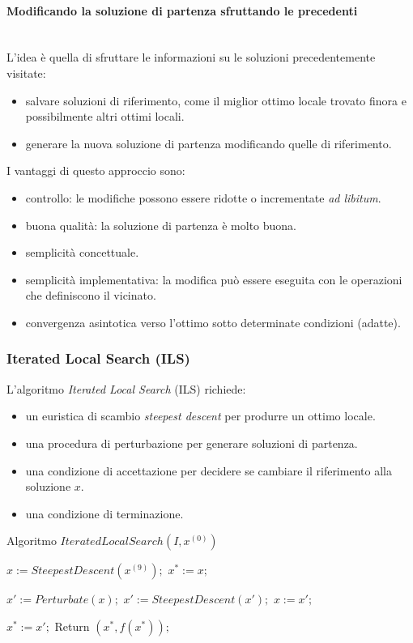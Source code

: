 \documentclass{article}
\begin{document}
\paragraph{Modificando la soluzione di partenza sfruttando le precedenti}\mbox{}\\
L'idea è quella di sfruttare le informazioni su le soluzioni precedentemente visitate:
\begin{itemize}
    \item salvare soluzioni di riferimento, come il miglior ottimo locale
    trovato finora e possibilmente altri ottimi locali.
    \item generare la nuova soluzione di partenza modificando quelle di riferimento.
\end{itemize}
I vantaggi di questo approccio sono:
\begin{itemize}
    \item controllo: le modifiche possono essere ridotte o incrementate \textit{ad libitum}.
    \item buona qualità: la soluzione di partenza è molto buona.
    \item semplicità concettuale.
    \item semplicità implementativa: la modifica può essere eseguita con le operazioni
    che definiscono il vicinato.
    \item convergenza asintotica verso l'ottimo sotto determinate condizioni (adatte).
\end{itemize}

\subsubsection{Iterated Local Search (ILS)}
L'algoritmo \textit{Iterated Local Search} (ILS) richiede:
\begin{itemize}
    \item un euristica di scambio \textit{steepest descent} per produrre un ottimo locale.
    \item una procedura di perturbazione per generare soluzioni di partenza.
    \item una condizione di accettazione per decidere se cambiare il riferimento alla soluzione $x$.
    \item una condizione di terminazione.
\end{itemize}

\begin{algorithm}[H]
    \caption{Algoritmo $IteratedLocalSearch(I,x^{(0)})$}
    \begin{algorithmic}
        \State $x:=SteepestDescent(x^{(9)});$
        \State $x^*:=x;$

            \State $x':=Perturbate(x);$
            \State $x':=SteepestDescent(x');$
                \State $x:=x';$
            \EndIf

                \State $x^*:=x';$
            \EndIf
        \EndFor
        \State Return $(x^*,f(x^*));$

    \end{algorithmic}
\end{algorithm}
\end{document}
